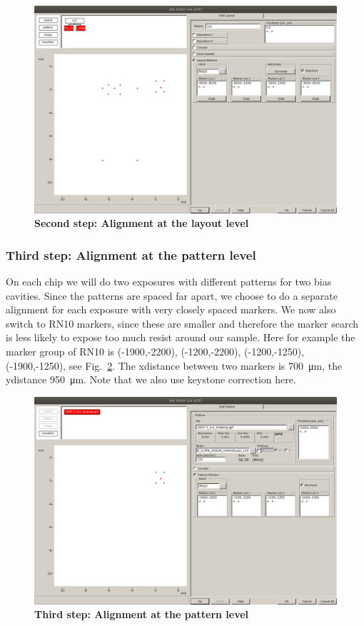 \begin{figure}
	\centering
	\includegraphics[width=\linewidth]{appendix/figs/ebeam3}
	\caption{\textbf{Second step: Alignment at the layout level}}
	\label{fig:ebeam3}
\end{figure}

\subsubsection{Third step: Alignment at the pattern level}
%
On each chip we will do two exposures with different patterns for two bias cavities. 
%
Since the patterns are spaced far apart, we choose to do a separate alignment for each exposure with very closely spaced markers. 
%
We now also switch to RN10 markers, since these are smaller and therefore the marker search is less likely to expose too much resist around our sample. 
%
Here for example the marker group of RN10 is (-1900,-2200), (-1200,-2200), (-1200,-1250), (-1900,-1250), see Fig.~\ref{fig:ebeam4}.
%
The xdistance between two markers is \SI{700}{\micro\meter}, the ydistance \SI{950}{\micro\meter}. 
%
Note that we also use keystone correction here.

\begin{figure}
	\centering
	\includegraphics[width=\linewidth]{appendix/figs/ebeam4}
	\caption{\textbf{Third step: Alignment at the pattern level}}
	\label{fig:ebeam4}
\end{figure}


